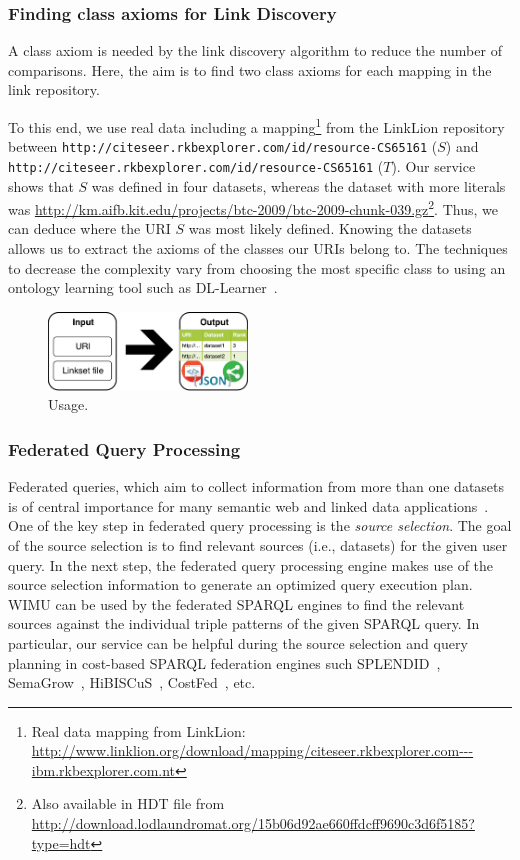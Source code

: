 \subsubsection{Finding class axioms for Link Discovery}

A class axiom is needed by the link discovery algorithm to reduce the number of comparisons. 
Here, the aim is to find two class axioms for each mapping in the link repository.

To this end, we use real data including a mapping\footnote{Real data mapping from LinkLion: \url{http://www.linklion.org/download/mapping/citeseer.rkbexplorer.com---ibm.rkbexplorer.com.nt}} from the Link\-Lion repository~\cite{linklion2014} between \texttt{http://citeseer.rkbexplorer.com/id/resource-CS65161} ($S$) and \texttt{http://citeseer.rkbexplorer.com/id/resource-CS65161} ($T$). 
Our service shows that $S$ was defined in four datasets, whereas the dataset with more literals was \url{http://km.aifb.kit.edu/projects/btc-2009/btc-2009-chunk-039.gz}\footnote{Also available in HDT file from \url{http://download.lodlaundromat.org/15b06d92ae660ffdcff9690c3d6f5185?type=hdt}}. 
Thus, we can deduce where the URI $S$ was most likely defined.
Knowing the datasets allows us to extract the axioms of the classes our URIs belong to.
The techniques to decrease the complexity vary from choosing the most specific class to using an ontology learning tool such as DL-Learner~\cite{lehmann2009dl}.

\begin{figure}[htb] 
	\centering
	\includegraphics[width=150pt]{img/usage.pdf}
	\caption{Usage.}
	\label{fig:usage}
\end{figure}

\subsubsection{Federated Query Processing}
Federated queries, which aim to collect information from more than one datasets is of central importance for many semantic web and linked data applications~\cite{saleem2013fostering,bigtcga2014}. One of the key step in federated query processing is the \emph{source selection}. The goal of the source selection is to find relevant sources (i.e., datasets) for the given user query. In the next step, the federated query processing engine makes use of the source selection information to generate an optimized query execution plan. WIMU can be used by the federated SPARQL engines to find the relevant sources against the individual triple patterns of the given SPARQL query. In particular, our service can be helpful during the source selection and query planning in cost-based SPARQL federation engines such SPLENDID~\cite{splendid2011}, SemaGrow~\cite{semagrow2015}, HiBISCuS~\cite{hibiscus2014}, CostFed~\cite{costfed2017}, etc.  

